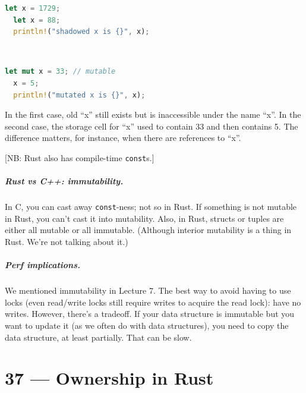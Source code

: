 \documentclass[a4paper]{report}
\begin{document}
\vspace*{-1.5em}
\begin{minipage}{.4\textwidth}
\begin{lstlisting}[language=Rust]
  let x = 1729;
  let x = 88;
  println!("shadowed x is {}", x);
\end{lstlisting}
\end{minipage}\
\begin{minipage}{.4\textwidth}
\begin{lstlisting}[language=Rust]
  let mut x = 33; // mutable
  x = 5;
  println!("mutated x is {}", x);
\end{lstlisting}
\end{minipage}

In the first case, old ``x'' still exists but is inaccessible under the name ``x''.
In the second case, the storage cell for ``x'' used to contain 33 and then contains 5.
The difference matters, for instance, when there are references to ``x''.

[NB: Rust also has compile-time {\tt const}s.]

\paragraph{Rust vs C++: immutability.} In C, you can cast away {\tt const}-ness; not so in Rust.
If something is not mutable in Rust, you can't cast it into mutability. Also, in Rust, structs or
tuples are either all mutable or all immutable. (Although interior mutability is a thing in Rust. We're
not talking about it.)

\paragraph{Perf implications.}
We mentioned immutability in Lecture 7. The best way to avoid having
to use locks (even read/write locks still require writes to acquire
the read lock): have no writes.  However, there's a tradeoff. If your
data structure is immutable but you want to update it (as we often do
with data structures), you need to copy the data structure, at least
partially. That can be slow.









\chapter*{37 --- Ownership in Rust}
\end{document}
